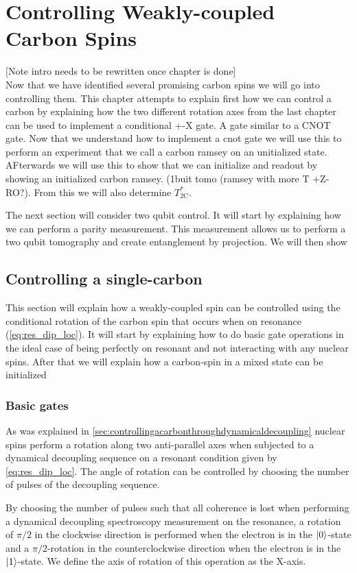 \chapter{Controlling Weakly-coupled Carbon Spins}
[Note intro needs to be rewritten once chapter is done]\\
Now that we have identified several promising carbon spins we will go into controlling them.
This chapter attempts to explain first how we can control a carbon by explaining how the two different rotation axes from the last chapter can be used to implement a conditional +-X gate. A gate similar to a CNOT gate.
Now that we understand how to implement a cnot gate we will use this to perform an experiment that we call a carbon ramsey on an unitialized state.
AFterwards we will use this to show that we can initialize and readout by showing an initialized carbon ramsey. (1buit tomo (ramsey with more T +Z-RO?).
From this we will also determine $T_{2 \mathrm{C}}^*$.

The next section will consider two qubit control.
It will start by explaining how we can perform a parity measurement. This measurement allows us to perform a two qubit tomography and create entanglement by projection.
We will then show

\section{Controlling a single-carbon}
This section will explain how a weakly-coupled spin can be controlled using the conditional rotation of the carbon spin that occurs when on resonance (\cref{eq:res_dip_loc}).
It will start by explaining how to do basic gate operations in the ideal case of being perfectly on resonant and not interacting with any nuclear spins.
After that we will explain how a carbon-spin in a mixed state can be initialized

\subsection{Basic gates}
As was explained in \cref{sec:controllingacarbonthroughdynamicaldecoupling} nuclear spins perform a rotation along two anti-parallel axes when subjected to a dynamical decoupling sequence on a resonant condition given by \cref{eq:res_dip_loc}.
The angle of rotation can be controlled by choosing the number of pulses of the decoupling sequence.

By choosing the number of pulses such that all coherence is lost when performing a dynamical decoupling spectroscopy measurement on the resonance, a rotation of $\pi/2$ in the clockwise direction is performed when the electron is in the ${\left\vert{0}\right\rangle}$-state and a $\pi/2$-rotation in the counterclockwise direction when the electron is in the ${\left\vert{1}\right\rangle}$-state.
We define the axis of rotation of this operation as the X-axis.

